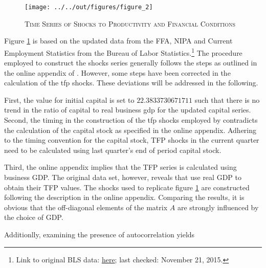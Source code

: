 \begin{figure}[ht]
    
    \centering

    \texttt{[image: ../../out/figures/figure\_2]}

    \caption{\textsc{Time Series of Shocks to Productivity and Financial Conditions}}
    
    \label{fig:figure_2}

\end{figure}

Figure \ref{fig:figure_2} is based on the updated data from the FFA, NIPA and Current Employment Statistics from the Bureau of Labor Statistics.\footnote{Link to original BLS data: \href{https://research.stlouisfed.org/fred2/series/AWHI/downloaddata}{here}; last checked: November 21, 2015.} 
The procedure employed to construct the shocks series generally follows the steps as outlined in the online appendix of \citeauthor{JERMANNfinancial}. However, some steps have been corrected in the calculation of the tfp shocks. These deviations will be addressed in the following. 

First, the value for initial capital is set to $22.3833730671711$ such that there is no trend in the ratio of capital to real business gdp for the updated capital series. Second, the timing in the construction of the tfp shocks employed by \citeauthor{JERMANNfinancial} contradicts the calculation of the capital stock as specified in the online appendix. Adhering to the timing convention for the capital stock, TFP shocks in the current quarter need to be calculated using last quarter's end of period capital stock. 

Third, the online appendix implies that the TFP series is calculated using 
business GDP.
The original data set, however, reveals that \citeauthor{JERMANNfinancial} use real GDP to obtain their TFP values. The shocks used to replicate figure \ref{fig:figure_2} are constructed following the description in the online appendix. Comparing the results, it is obvious that the off-diagonal elements of the matrix $A$ are strongly influenced by the choice of GDP. 

Additionlly, examining the presence of autocorrelation yields

